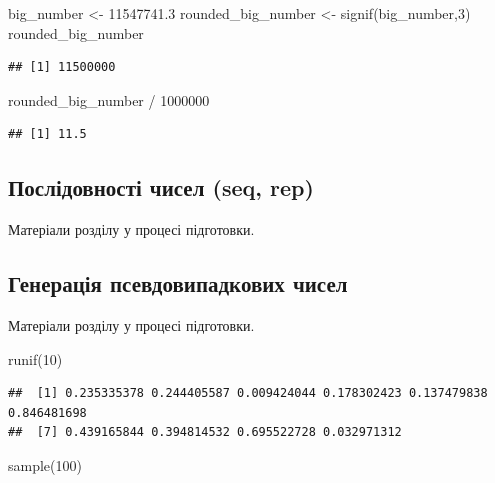 \documentclass[
]{book}
\newenvironment{Shaded}{\begin{snugshade}}{\end{snugshade}}
\newcommand{\DecValTok}[1]{\textcolor[rgb]{0.00,0.00,0.81}{#1}}
\newcommand{\FloatTok}[1]{\textcolor[rgb]{0.00,0.00,0.81}{#1}}
\newcommand{\FunctionTok}[1]{\textcolor[rgb]{0.00,0.00,0.00}{#1}}
\newcommand{\NormalTok}[1]{#1}
\newcommand{\OtherTok}[1]{\textcolor[rgb]{0.56,0.35,0.01}{#1}}
\newcommand{\SpecialCharTok}[1]{\textcolor[rgb]{0.00,0.00,0.00}{#1}}
\begin{document}
\begin{Shaded}
\begin{Highlighting}[]
\NormalTok{big\_number }\OtherTok{\textless{}{-}} \FloatTok{11547741.3}
\NormalTok{rounded\_big\_number }\OtherTok{\textless{}{-}} \FunctionTok{signif}\NormalTok{(big\_number,}\DecValTok{3}\NormalTok{)}
\NormalTok{rounded\_big\_number}
\end{Highlighting}
\end{Shaded}

\begin{verbatim}
## [1] 11500000
\end{verbatim}

\begin{Shaded}
\begin{Highlighting}[]
\NormalTok{rounded\_big\_number }\SpecialCharTok{/} \DecValTok{1000000}
\end{Highlighting}
\end{Shaded}

\begin{verbatim}
## [1] 11.5
\end{verbatim}

\hypertarget{chapter242}{%
\subsection{Послідовності чисел (seq, rep)}\label{chapter242}}

Матеріали розділу у процесі підготовки.

\hypertarget{chapter243}{%
\subsection{Генерація псевдовипадкових чисел}\label{chapter243}}

Матеріали розділу у процесі підготовки.

\begin{Shaded}
\begin{Highlighting}[]
\FunctionTok{runif}\NormalTok{(}\DecValTok{10}\NormalTok{)}
\end{Highlighting}
\end{Shaded}

\begin{verbatim}
##  [1] 0.235335378 0.244405587 0.009424044 0.178302423 0.137479838 0.846481698
##  [7] 0.439165844 0.394814532 0.695522728 0.032971312
\end{verbatim}

\begin{Shaded}
\begin{Highlighting}[]
\FunctionTok{sample}\NormalTok{(}\DecValTok{100}\NormalTok{)}
\end{Highlighting}
\end{Shaded}
\end{document}
